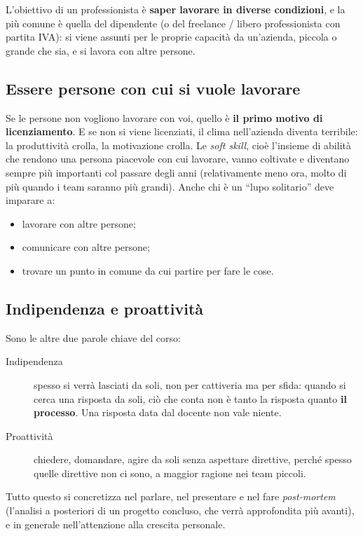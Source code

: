 L'obiettivo di un professionista è \textbf{saper lavorare in diverse
condizioni}, e la più comune è quella del dipendente (o del freelance /
libero professionista con partita IVA): si viene assunti per le proprie
capacità da un'azienda, piccola o grande che sia, e si lavora con altre
persone.

\subsection{Essere persone con cui si vuole lavorare}

Se le persone non vogliono lavorare con voi, quello è \textbf{il primo motivo
di licenziamento}. E se non si viene licenziati, il clima nell'azienda
diventa terribile: la produttività crolla, la motivazione crolla. Le
\emph{soft skill}, cioè l'insieme di abilità che rendono una persona
piacevole con cui lavorare, vanno coltivate e diventano sempre più importanti
col passare degli anni (relativamente meno ora, molto di più quando i team
saranno più grandi). Anche chi è un ``lupo solitario'' deve imparare a:
\begin{itemize}
  \item lavorare con altre persone;
  \item comunicare con altre persone;
  \item trovare un punto in comune da cui partire per fare le cose.
\end{itemize}

\subsection{Indipendenza e proattività}

Sono le altre due parole chiave del corso:
\begin{description}
  \item[Indipendenza] spesso si verrà lasciati da soli, non per cattiveria ma
        per sfida: quando si cerca una risposta da soli, ciò che conta non è
        tanto la risposta quanto \textbf{il processo}. Una risposta data dal
        docente non vale niente.
  \item[Proattività] chiedere, domandare, agire da soli senza aspettare
        direttive, perché spesso quelle direttive non ci sono, a maggior
        ragione nei team piccoli.
\end{description}
Tutto questo si concretizza nel parlare, nel presentare e nel fare
\emph{post-mortem} (l'analisi a posteriori di un progetto concluso, che verrà
approfondita più avanti), e in generale nell'attenzione alla crescita
personale.

